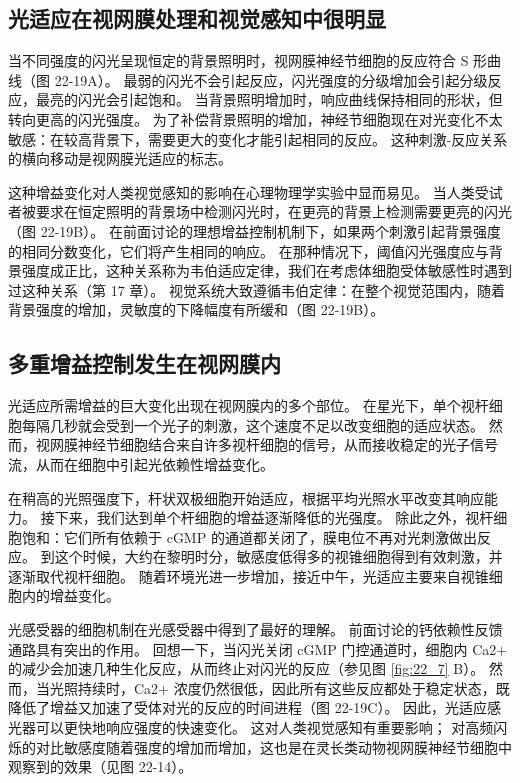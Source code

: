 \subsection{光适应在视网膜处理和视觉感知中很明显}
当不同强度的闪光呈现恒定的背景照明时，视网膜神经节细胞的反应符合 S 形曲线（图 22-19A）。 最弱的闪光不会引起反应，闪光强度的分级增加会引起分级反应，最亮的闪光会引起饱和。 当背景照明增加时，响应曲线保持相同的形状，但转向更高的闪光强度。 为了补偿背景照明的增加，神经节细胞现在对光变化不太敏感：在较高背景下，需要更大的变化才能引起相同的反应。 这种刺激-反应关系的横向移动是视网膜光适应的标志。

这种增益变化对人类视觉感知的影响在心理物理学实验中显而易见。 当人类受试者被要求在恒定照明的背景场中检测闪光时，在更亮的背景上检测需要更亮的闪光（图 22-19B）。 在前面讨论的理想增益控制机制下，如果两个刺激引起背景强度的相同分数变化，它们将产生相同的响应。 在那种情况下，阈值闪光强度应与背景强度成正比，这种关系称为韦伯适应定律，我们在考虑体细胞受体敏感性时遇到过这种关系（第 17 章）。 视觉系统大致遵循韦伯定律：在整个视觉范围内，随着背景强度的增加，灵敏度的下降幅度有所缓和（图 22-19B）。

\subsection{多重增益控制发生在视网膜内}
光适应所需增益的巨大变化出现在视网膜内的多个部位。 在星光下，单个视杆细胞每隔几秒就会受到一个光子的刺激，这个速度不足以改变细胞的适应状态。 然而，视网膜神经节细胞结合来自许多视杆细胞的信号，从而接收稳定的光子信号流，从而在细胞中引起光依赖性增益变化。

在稍高的光照强度下，杆状双极细胞开始适应，根据平均光照水平改变其响应能力。 接下来，我们达到单个杆细胞的增益逐渐降低的光强度。 除此之外，视杆细胞饱和：它们所有依赖于 cGMP 的通道都关闭了，膜电位不再对光刺激做出反应。 到这个时候，大约在黎明时分，敏感度低得多的视锥细胞得到有效刺激，并逐渐取代视杆细胞。 随着环境光进一步增加，接近中午，光适应主要来自视锥细胞内的增益变化。

光感受器的细胞机制在光感受器中得到了最好的理解。 前面讨论的钙依赖性反馈通路具有突出的作用。 回想一下，当闪光关闭 cGMP 门控通道时，细胞内 Ca2+ 的减少会加速几种生化反应，从而终止对闪光的反应（参见图 \ref{fig:22_7} B）。 然而，当光照持续时，Ca2+ 浓度仍然很低，因此所有这些反应都处于稳定状态，既降低了增益又加速了受体对光的反应的时间进程（图 22-19C）。 因此，光适应感光器可以更快地响应强度的快速变化。 这对人类视觉感知有重要影响； 对高频闪烁的对比敏感度随着强度的增加而增加，这也是在灵长类动物视网膜神经节细胞中观察到的效果（见图 22-14）。

